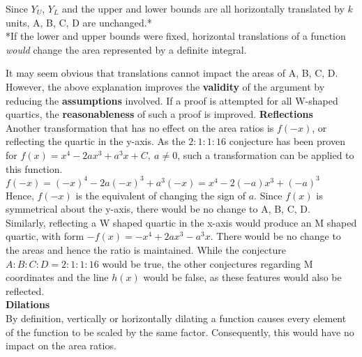 \documentclass{homework}
\begin{document}
\begin{flushleft}
\begin{paracol}{2}
    Since $Y_U$, $Y_L$ and the upper and lower bounds are all horizontally translated by $k$ units, A, B, C, D are unchanged.* \vspace{0.8em}\\
    \tiny{*If the lower and upper bounds were fixed, horizontal translations of a function \textit{would} change the area represented by a definite integral.}\\
\end{paracol}
\vspace{0.8em}
It may seem obvious that translations cannot impact the areas of A, B, C, D. However, the above explanation improves the \textbf{validity} of the argument by reducing the \textbf{assumptions} involved. If a proof is attempted for all W-shaped quartics, the \textbf{reasonableness} of such a proof is improved. 
\newpage
\normalsize{\textbf{Reflections}} \vspace{0.5em}\\
    Another transformation that has no effect on the area ratios is $f(-x)$, or reflecting the quartic in the y-axis. As the $2:1:1:16$ conjecture has been proven for $f(x)=x^4-2ax^3+a^3x+C,\ a\neq0$, such a transformation can be applied to this function. \vspace{0.8em}\\
    $f(-x)=(-x)^4-2a(-x)^3+a^3(-x)=x^4-2(-a)x^3+(-a)^3$ \vspace{0.8em}\\
    Hence, $f(-x)$ is the equivalent of changing the sign of $a$. Since $f(x)$ is symmetrical about the y-axis, there would be no change to A, B, C, D. \vspace{0.6em}\\
    Similarly, reflecting a W shaped quartic in the x-axis would produce an M shaped quartic, with form $-f(x)=-x^4+2ax^3-a^3x$. There would be no change to the areas and hence the ratio is maintained. While the conjecture $A:B:C:D=2:1:1:16$ would be true, the other conjectures regarding M coordinates and the line $h(x)$ would be false, as these features would also be reflected. \vspace{2em}\\
    \textbf{Dilations} \vspace{0.5em}\\
    By definition, vertically or horizontally dilating a function causes every element of the function to be scaled by the same factor. Consequently, this would have no impact on the area ratios. \vspace{0.8em} \\

\end{flushleft}
\end{document}
